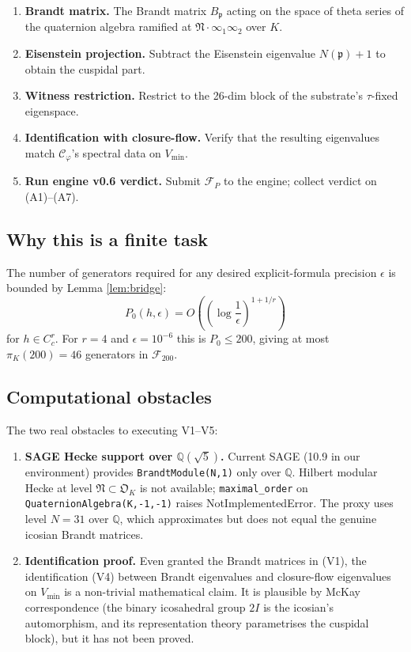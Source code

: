 \documentclass[11pt,a4paper]{article}
\theoremstyle{definition}
\newcommand{\Q}{\mathbb{Q}}
\newcommand{\Vmin}{V_{\min}}
\newcommand{\Cphi}{\mathcal{C}_{\!\varphi}}
\begin{document}
\begin{enumerate}[label=(V\arabic*)]
\item \textbf{Brandt matrix.} The Brandt matrix $B_\mathfrak{p}$ acting on the
      space of theta series of the quaternion algebra ramified at
      $\mathfrak{N}\cdot\infty_1\infty_2$ over $K$.
\item \textbf{Eisenstein projection.} Subtract the Eisenstein eigenvalue
      $N(\mathfrak{p})+1$ to obtain the cuspidal part.
\item \textbf{Witness restriction.} Restrict to the 26-dim block of the
      substrate's $\tau$-fixed eigenspace.
\item \textbf{Identification with closure-flow.} Verify that the resulting
      eigenvalues match $\Cphi$'s spectral data on $\Vmin$.
\item \textbf{Run engine v0.6 verdict.} Submit $\mathcal{F}_P$ to the engine;
      collect verdict on (A1)--(A7).
\end{enumerate}

\subsection{Why this is a finite task}
The number of generators required for any desired explicit-formula precision
$\epsilon$ is bounded by Lemma \ref{lem:bridge}:
$$
P_0(h,\epsilon) = O\!\left(\left(\log\frac{1}{\epsilon}\right)^{1+1/r}\right)
$$
for $h\in C^r_c$. For $r=4$ and $\epsilon = 10^{-6}$ this is $P_0\le 200$,
giving at most $\pi_K(200)=46$ generators in $\mathcal{F}_{200}$.

\subsection{Computational obstacles}
The two real obstacles to executing V1--V5:
\begin{enumerate}
\item \textbf{SAGE Hecke support over $\Q(\sqrt{5})$.} Current SAGE (10.9 in
      our environment) provides \texttt{BrandtModule(N,1)} only over $\Q$.
      Hilbert modular Hecke at level $\mathfrak{N}\subset\mathfrak{O}_K$ is
      not available; \texttt{maximal\_order} on
      \texttt{QuaternionAlgebra(K,-1,-1)} raises NotImplementedError. The
      proxy uses level $N=31$ over $\Q$, which approximates but does not equal
      the genuine icosian Brandt matrices.
\item \textbf{Identification proof.} Even granted the Brandt matrices in (V1),
      the identification (V4) between Brandt eigenvalues and closure-flow
      eigenvalues on $\Vmin$ is a non-trivial mathematical claim. It is
      plausible by McKay correspondence (the binary icosahedral group $2I$ is
      the icosian's automorphism, and its representation theory parametrises
      the cuspidal block), but it has not been proved.
\end{enumerate}
\end{document}
